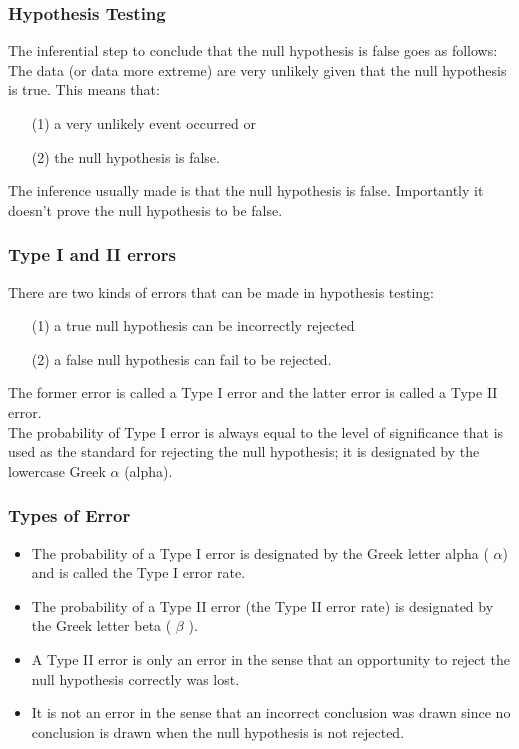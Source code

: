 ﻿%
\begin{frame}
\frametitle{Hypothesis Testing}
\large
The inferential step to conclude that the null hypothesis is false goes as follows: The data (or data more extreme) are very unlikely given that the null hypothesis is true. 
\bigskip
This means that: 
\begin{itemize}\item [(1)] a very unlikely event occurred or 
\item[(2)] the null hypothesis is false. \end{itemize}

The inference usually made is that the null hypothesis is false. Importantly it doesn’t prove the null hypothesis to be false.
\end{frame}
\begin{frame}
\frametitle{Type I and II errors}
\large
There are two kinds of errors that can be made in hypothesis testing: 
\begin{itemize}
\item[(1)] a true null hypothesis can be incorrectly rejected  
\item[(2)] a false null hypothesis can fail to be rejected. 
\end{itemize}

The former error is called a Type I error and the latter error is called a Type II error. \\

The probability of Type I error is always equal to the level of significance that is used as the standard for rejecting
the null hypothesis; it is designated by the lowercase Greek $\alpha$ (alpha).

\end{frame}

\begin{frame}
\frametitle{Types of Error}
\begin{itemize}
\item The probability of a Type I error is designated by the Greek letter alpha ( $\alpha$) and is called the Type I error rate. 
\item The probability of a Type II error (the Type II error rate) is designated by the Greek letter beta ( $\beta$ ). 
\item A Type II error is only an error in the sense that an opportunity to reject the null hypothesis correctly was lost. 
\item It is not an error in the sense that an incorrect conclusion was drawn since no conclusion is drawn when the null hypothesis is not rejected.
\end{itemize}
\end{frame}

